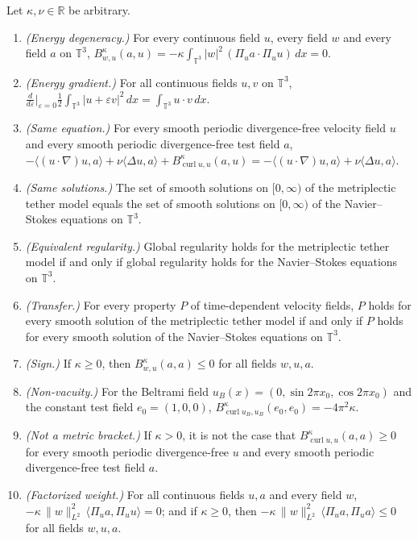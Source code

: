 \begin{theorem}\label{thm:main}
Let $\kappa,\nu\in\mathbb{R}$ be arbitrary.
\begin{enumerate}[label=(\alph*)]
\item\label{it:deg} \emph{(Energy degeneracy.)} For every continuous field $u$, every field $w$ and every field $a$ on $\mathbb{T}^3$,
  $B^{\kappa}_{w,u}(a,u)=-\kappa\int_{\mathbb{T}^3}|w|^2\,(\Pi_u a\cdot\Pi_u u)\,dx=0$.
\item\label{it:grad} \emph{(Energy gradient.)} For all continuous fields $u,v$ on $\mathbb{T}^3$,
  $\frac{d}{d\varepsilon}\big|_{\varepsilon=0}\tfrac12\int_{\mathbb{T}^3}|u+\varepsilon v|^2\,dx=\int_{\mathbb{T}^3}u\cdot v\,dx$.
\item\label{it:rhs} \emph{(Same equation.)} For every smooth periodic divergence-free velocity field $u$ and every smooth periodic divergence-free test field $a$,
  $-\langle(u\cdot\nabla)u,a\rangle+\nu\langle\Delta u,a\rangle+B^{\kappa}_{\operatorname{curl}u,u}(a,u)=-\langle(u\cdot\nabla)u,a\rangle+\nu\langle\Delta u,a\rangle$.
\item\label{it:sol} \emph{(Same solutions.)} The set of smooth solutions on $[0,\infty)$ of the metriplectic tether model equals the set of smooth solutions on $[0,\infty)$ of the Navier--Stokes equations on $\mathbb{T}^3$.
\item\label{it:reg} \emph{(Equivalent regularity.)} Global regularity holds for the metriplectic tether model if and only if global regularity holds for the Navier--Stokes equations on $\mathbb{T}^3$.
\item\label{it:prop} \emph{(Transfer.)} For every property $P$ of time-dependent velocity fields, $P$ holds for every smooth solution of the metriplectic tether model if and only if $P$ holds for every smooth solution of the Navier--Stokes equations on $\mathbb{T}^3$.
\item\label{it:sign} \emph{(Sign.)} If $\kappa\ge 0$, then $B^{\kappa}_{w,u}(a,a)\le 0$ for all fields $w,u,a$.
\item\label{it:beltrami} \emph{(Non-vacuity.)} For the Beltrami field $u_B(x)=(0,\sin 2\pi x_0,\cos 2\pi x_0)$ and the constant test field $e_0=(1,0,0)$,
  $B^{\kappa}_{\operatorname{curl}u_B,u_B}(e_0,e_0)=-4\pi^2\kappa$.
\item\label{it:psd} \emph{(Not a metric bracket.)} If $\kappa>0$, it is not the case that $B^{\kappa}_{\operatorname{curl}u,u}(a,a)\ge 0$ for every smooth periodic divergence-free $u$ and every smooth periodic divergence-free test field $a$.
\item\label{it:fac} \emph{(Factorized weight.)} For all continuous fields $u,a$ and every field $w$, $-\kappa\,\|w\|_{L^2}^2\,\langle\Pi_u a,\Pi_u u\rangle=0$; and if $\kappa\ge0$, then $-\kappa\,\|w\|_{L^2}^2\,\langle\Pi_u a,\Pi_u a\rangle\le 0$ for all fields $w,u,a$.
\end{enumerate}
\end{theorem}
